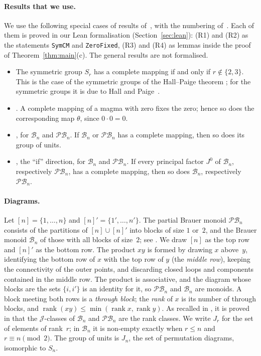 \documentclass[11pt]{article}
\theoremstyle{remark}
\newcommand{\B}{\mathcal B}
\newcommand{\PB}{\mathcal{PB}}
\newcommand{\rk}{\operatorname{rank}}
\begin{document}
\paragraph{Results that we use.}
We use the following special cases of results of~\cite{abchk}, with the
numbering of~\cite{abchk}. Each of them is proved in our Lean formalisation
(Section~\ref{sec:lean}): (R1) and (R2) as the statements \texttt{SymCM} and
\texttt{ZeroFixed}, (R3) and (R4) as lemmas inside the proof of
Theorem~\ref{thm:main}(c). The general results are not formalised.
\begin{itemize}
\item[(R1)] The symmetric group $S_r$ has a complete mapping if and only if
 $r\notin\{2,3\}$. This is the case of the symmetric groups of the Hall--Paige
 theorem \cite[Theorem~1.1]{abchk}; for the symmetric groups it is due to Hall
 and Paige~\cite[Theorems~2 and~5]{hp55}.
\item[(R2)] \cite[Proposition~1.4]{abchk}. A complete mapping of a magma with
 zero fixes the zero; hence so does the corresponding map $\theta$, since
 $0\cdot0=0$.
\item[(R3)] \cite[Corollary~3.4]{abchk}, for $\B_n$ and $\PB_n$. If $\B_n$ or
 $\PB_n$ has a complete mapping, then so does its group of units.
\item[(R4)] \cite[Theorem~4.4]{abchk}, the ``if'' direction, for $\B_n$ and
 $\PB_n$. If every principal factor $J^0$ of $\B_n$, respectively $\PB_n$, has
 a complete mapping, then so does $\B_n$, respectively $\PB_n$.
\end{itemize}

\paragraph{Diagrams.}
Let $[n]=\{1,\dots,n\}$ and $[n]'=\{1',\dots,n'\}$. The partial Brauer monoid
$\PB_n$ consists of the partitions of $[n]\cup[n]'$ into blocks of size $1$
or~$2$, and the Brauer monoid $\B_n$ of those with all blocks of size~$2$; see
\cite[Section~2.2]{emrt}. We draw $[n]$ as the top row and $[n]'$ as the
bottom row. The product $xy$ is formed by drawing $x$ above~$y$, identifying
the bottom row of $x$ with the top row of $y$ (the \emph{middle row}), keeping
the connectivity of the outer points, and discarding closed loops and
components contained in the middle row. The product is associative, and the
diagram whose blocks are the sets $\{i,i'\}$ is an identity for it, so $\PB_n$
and $\B_n$ are monoids. A block meeting both rows is a
\emph{through block}; the \emph{rank} of $x$ is its number of through blocks,
and $\rk(xy)\le\min(\rk x,\rk y)$. As recalled in \cite[Section~15]{abchk},
it is proved in \cite[Proposition~2.1 and Remark~2.2(v)--(vii)]{emrt} that the
$\mathcal J$-classes of $\B_n$ and $\PB_n$ are the rank classes. We write $J_r$
for the set of elements of rank~$r$; in $\B_n$ it is non-empty exactly when
$r\le n$ and $r\equiv n\pmod2$. The group of units is $J_n$, the set of
permutation diagrams, isomorphic to $S_n$.
\end{document}
